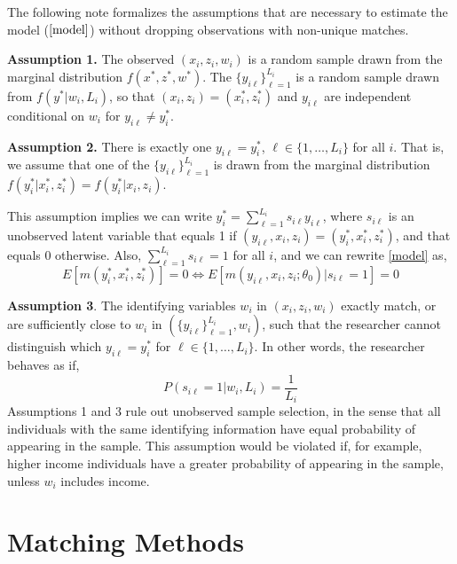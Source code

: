 \documentclass[12pt]{article}
\begin{document}
The following note formalizes the assumptions that are necessary to estimate the model ($\ref{model}$) without dropping observations with non-unique matches.


\textbf{Assumption 1.} The observed $(x_i, z_i, w_i)$ is a random sample drawn from the marginal distribution $f(x^*, z^*, w^*)$.   The $\{y_{i\ell}\}_{\ell=1}^{L_i}$ is a random sample drawn from $f(y^* | w_i, L_i)$, so that $(x_i, z_i) = (x_i^*,z_i^*)$ and $y_{i\ell}$ are independent conditional on $w_i$ for $y_{i\ell} \neq y_i^*$. 

\textbf{Assumption 2.}  There is exactly one $y_{i\ell} = y_i^*$, $\ell\in \{1, \dots, L_i\}$ for all $i.$ That is, we assume that one of the $\{y_{i\ell}\}_{\ell=1}^{L_i}$ is drawn from the marginal distribution $f(y_i^* | x_i^*, z_i^*) = f(y_i^* | x_i, z_i)$.   

This assumption implies we can write $y_i^* = \sum_{\ell=1}^{L_i} s_{i\ell} y_{i\ell}$, where $s_{i\ell}$ is an unobserved latent variable that equals 1 if $(y_{i\ell}, x_i, z_i) = (y_i^*, x_i^*, z_i^*)$, and that equals 0 otherwise.  
Also, $\sum_{\ell=1}^{L_i} s_{i\ell} = 1$ for all $i$, and we can rewrite \ref{model} as,
\begin{equation} E\left[m(y_i^*, x_i^*, z_i^*)\right] = 0 \iff E\left[m(y_{i\ell},x_i,z_i; \theta_0) | s_{i\ell} =1 \right] = 0  \tag{$1^*$} \label{truemodel} \end{equation} 

\textbf{Assumption 3}. The identifying variables $w_i$ in $(x_i, z_i, w_i)$ exactly match, or are sufficiently close to $w_i$ in $(\{y_{i\ell}\}_{\ell=1}^{L_i}, w_i)$, such that the researcher cannot distinguish which $y_{i\ell} = y_i^*$ for $\ell \in \{1, \dots, L_i\}$.  In other words, the researcher behaves as if,  
$$P(s_{i\ell}=1 | w_i, L_i) = \frac{1}{L_i}$$ 
Assumptions 1 and 3 rule out unobserved sample selection, in the sense that all individuals with the same identifying information have equal probability of appearing in the sample.  This assumption would be violated if, for example, higher income individuals have a greater probability of appearing in the sample, unless $w_i$ includes income.   




 

\newpage
\section{Matching Methods}
\end{document}
